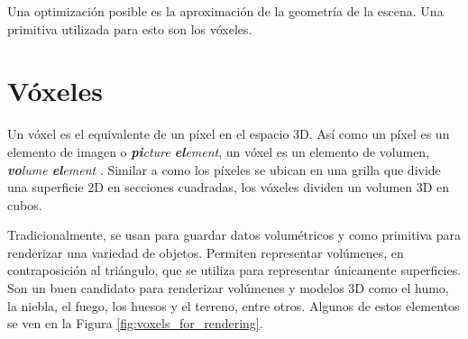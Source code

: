Una optimización posible es la aproximación de la geometría de la escena.
Una primitiva utilizada para esto son los vóxeles.

\section{Vóxeles}\label{sec:voxels}

Un vóxel es el equivalente de un píxel en el espacio 3D.
Así como un píxel es un elemento de imagen o \textit{\textbf{pi}cture \textbf{el}ement}, un vóxel es un elemento de volumen, \textit{\textbf{vo}lume \textbf{el}ement} \cite{rtr}.
Similar a como los píxeles se ubican en una grilla que divide una superficie 2D en secciones cuadradas, los vóxeles dividen un volumen 3D en cubos.

Tradicionalmente, se usan para guardar datos volumétricos y como primitiva para renderizar una variedad de objetos.
Permiten representar volúmenes, en contraposición al triángulo, que se utiliza para representar únicamente superficies.
Son un buen candidato para renderizar volúmenes y modelos 3D como el humo, la niebla, el fuego, los huesos y el terreno, entre otros.
Algunos de estos elementos se ven en la Figura \ref{fig:voxels_for_rendering}. %

